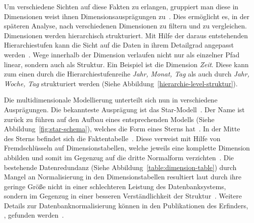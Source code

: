 \documentclass[
  language=german, %
  type=bachelor%
]{isthesis}
\begin{document}
\begin{content}
  Um verschiedene Sichten auf diese Fakten zu erlangen, gruppiert man diese in
  Dimensionen \bzw{} weist ihnen Dimensionsausprägungen zu~\cite[][S.
  66]{Kemper2010}. Dies ermöglicht es, in der späteren Analyse, nach
  verschiedenen Dimensionen zu filtern und zu vergleichen. Dimensionen werden
  hierarchisch strukturiert. Mit Hilfe der daraus entstehenden Hierarchiestufen
  kann die Sicht auf die Daten in ihrem Detailgrad angepasst werden~\cite[][S.
  66]{Kemper2010}. Wege innerhalb der Dimension verlaufen nicht nur als
  einzelner Pfad linear, sondern auch als Struktur. Ein Beispiel ist die
  Dimension \textit{Zeit}.  Diese kann zum einen durch die
  Hierarchiestufenreihe \textit{Jahr, Monat, Tag} als auch durch \textit{Jahr,
  Woche, Tag} strukturiert werden (Siehe
  Abbildung~\ref{hierarchie-level-struktur}).

  \begin{figure}[caption={Dimensionslevelstrukturbeispiel---Zeit}, label={hierarchie-level-struktur}]
    \resizebox{100pt}{!}{}
  \end{figure}

  Die multidimensionale Modellierung unterteilt sich nun in verschiedene Ausprägungen.
  Die bekannteste Ausprägung ist das Star-Modell~\cite[][S.
  2]{phipps2002automating}. Der Name ist zurück zu führen auf den Aufbau
  eines entsprechenden Modells (Siehe Abbildung~\ref{fig:star-schema}), welches
  die Form eines Sterns hat~\cite[][S.  44]{Kimball2013}. In der Mitte des
  Sterns befindet sich die Faktentabelle~\cite[][S. 67]{Kemper2010}. Diese
  verweist mit Hilfe von Fremdschlüsseln auf Dimensionstabellen, welche jeweils
  eine komplette Dimension abbilden und somit im Gegenzug auf die dritte
  Normalform verzichten~\cite[][S. 67 f.]{Kemper2010}. Die bestehende
  Datenredundanz (Siehe Abbildung~\ref{table:dimension-table}) durch Mangel an
  Normalisierung in den Dimensionstabellen resultiert laut
  \textsc{\citeauthor{Kimball2013}} durch ihre geringe Größe nicht in einer
  schlechteren Leistung des Datenbanksystems, sondern im Gegenzug in einer
  besseren Verständlichkeit der Struktur~\cite[][S. 15]{Kimball2013}. Weitere
  Details zur Datenbanknormalisierung können in den Publikationen des
  Erfinders, \textsc{\citeauthor{codd1970relational}}, gefunden
  werden~\citeyearpar{codd1970relational,codd1972further}.

  \begin{figure}[caption={Star-Schema Beispielmodell angelehnt an~\cite{Kemper2010} Abb. 2.30}, label={fig:star-schema}]
    \resizebox{0.5\linewidth}{!}{}
  \end{figure}


\end{content}
\end{document}
